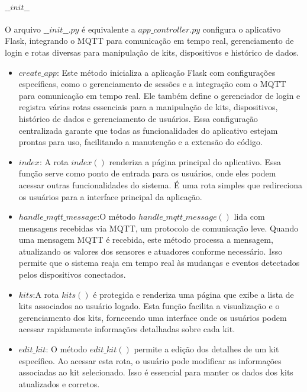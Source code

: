 \documentclass[conference, a4paper, 12pt]{IEEEtran}
\begin{document}
      \paragraph{$\_\_init\_\_$}
      O arquivo $\_\_init\_\_.py$ é equivalente a $app\_controller.py$ configura o aplicativo Flask, integrando o MQTT para comunicação em tempo real, gerenciamento de login e rotas diversas para manipulação de kits, dispositivos e histórico de dados.
      \begin{itemize}
          \item $create\_app$: Este método inicializa a aplicação Flask com configurações específicas, como o gerenciamento de sessões e a integração com o MQTT para comunicação em tempo real. Ele também define o gerenciador de login e registra várias rotas essenciais para a manipulação de kits, dispositivos, histórico de dados e gerenciamento de usuários. Essa configuração centralizada garante que todas as funcionalidades do aplicativo estejam prontas para uso, facilitando a manutenção e a extensão do código.
          
          \item $index$: A rota $index()$ renderiza a página principal do aplicativo. Essa função serve como ponto de entrada para os usuários, onde eles podem acessar outras funcionalidades do sistema. É uma rota simples que redireciona os usuários para a interface principal da aplicação.
         
          \item $handle\_mqtt\_message$:O método $handle\_mqtt\_message()$ lida com mensagens recebidas via MQTT, um protocolo de comunicação leve. Quando uma mensagem MQTT é recebida, este método processa a mensagem, atualizando os valores dos sensores e atuadores conforme necessário. Isso permite que o sistema reaja em tempo real às mudanças e eventos detectados pelos dispositivos conectados.
         
          \item $kits$:A rota $kits()$ é protegida e renderiza uma página que exibe a lista de kits associados ao usuário logado. Esta função facilita a visualização e o gerenciamento dos kits, fornecendo uma interface onde os usuários podem acessar rapidamente informações detalhadas sobre cada kit.
          
          \item $edit\_kit$: O método $edit\_kit()$ permite a edição dos detalhes de um kit específico. Ao acessar esta rota, o usuário pode modificar as informações associadas ao kit selecionado. Isso é essencial para manter os dados dos kits atualizados e corretos.
          

\end{itemize}
\end{document}
